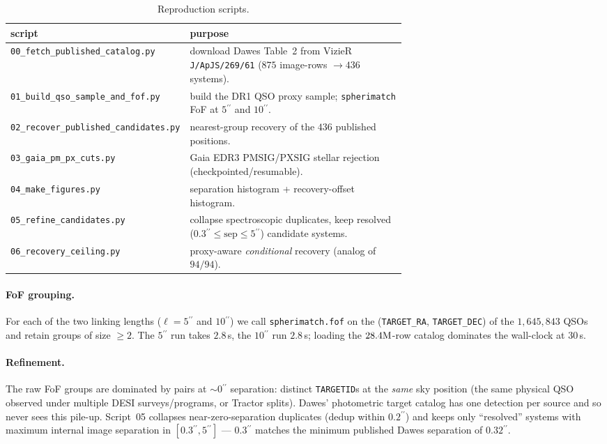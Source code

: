 \documentclass[11pt,letterpaper]{article}
\newcommand{\asec}{\ensuremath{^{\prime\prime}}}
\newcommand{\PMSIG}{\ensuremath{\mathrm{PMSIG}}}
\newcommand{\PXSIG}{\ensuremath{\mathrm{PXSIG}}}
\begin{document}
\begin{table}[ht]
\centering
\caption{Reproduction scripts.}
\label{tab:scripts}
\small
\begin{tabular}{lp{0.66\linewidth}}
\toprule
script & purpose \\
\midrule
\texttt{00\_fetch\_published\_catalog.py} &
  download Dawes Table~2 from VizieR \texttt{J/ApJS/269/61}
  ($875$ image-rows $\to 436$ systems). \\
\texttt{01\_build\_qso\_sample\_and\_fof.py} &
  build the DR1 QSO proxy sample; \texttt{spherimatch} FoF at $5\asec$
  and $10\asec$. \\
\texttt{02\_recover\_published\_candidates.py} &
  nearest-group recovery of the $436$ published positions. \\
\texttt{03\_gaia\_pm\_px\_cuts.py} &
  Gaia EDR3 $\PMSIG$/$\PXSIG$ stellar rejection (checkpointed/resumable). \\
\texttt{04\_make\_figures.py} &
  separation histogram + recovery-offset histogram. \\
\texttt{05\_refine\_candidates.py} &
  collapse spectroscopic duplicates, keep resolved
  ($0.3\asec \le \mathrm{sep} \le 5\asec$) candidate systems. \\
\texttt{06\_recovery\_ceiling.py} &
  proxy-aware \emph{conditional} recovery (analog of $94/94$). \\
\bottomrule
\end{tabular}
\end{table}

\paragraph{FoF grouping.} For each of the two linking lengths
($\ell = 5\asec$ and $10\asec$) we call \texttt{spherimatch.fof} on the
(\texttt{TARGET\_RA}, \texttt{TARGET\_DEC}) of the $1{,}645{,}843$ QSOs and
retain groups of size $\geq 2$. The $5\asec$ run takes $2.8$\,s, the
$10\asec$ run $2.8$\,s; loading the $28.4{\rm M}$-row catalog dominates the
wall-clock at $30$\,s.

\paragraph{Refinement.} The raw FoF groups are dominated by pairs at
${\sim}0\asec$ separation: distinct \texttt{TARGETID}s at the \emph{same}
sky position (the same physical QSO observed under multiple DESI
surveys/programs, or Tractor splits). Dawes' photometric target catalog has
one detection per source and so never sees this pile-up. Script~05 collapses
near-zero-separation duplicates (dedup within $0.2\asec$) and keeps only
``resolved'' systems with maximum internal image separation in
$[0.3\asec, 5\asec]$ --- $0.3\asec$ matches the minimum published Dawes
separation of $0.32\asec$.
\end{document}
